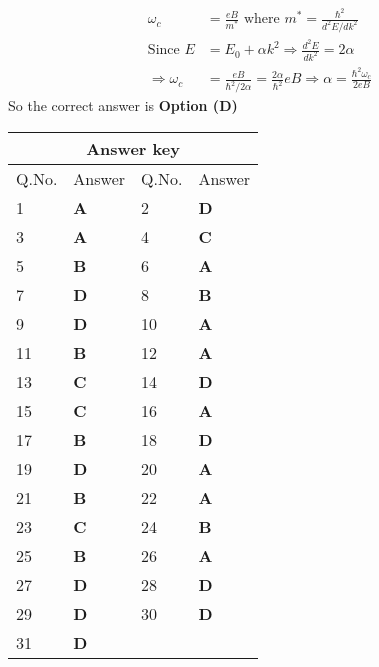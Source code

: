 \begin{enumerate}
\begin{tasks}
	\end{tasks}
	\begin{answer}
		\begin{align*}
		\omega_{c}&=\frac{e B}{m^{*}}\text{ where }m^{*}=\frac{\hbar^{2}}{d^{2} E / d k^{2}}\\
		\text{Since }E&=E_{0}+\alpha k^{2} \Rightarrow \frac{d^{2} E}{d k^{2}}=2 \alpha\\
		\Rightarrow \omega_{c}&=\frac{e B}{\hbar^{2} / 2 \alpha}=\frac{2 \alpha}{\hbar^{2}} e B \Rightarrow \alpha=\frac{\hbar^{2} \omega_{c}}{2 e B}
		\end{align*}
		So the correct answer is \textbf{Option (D)}
	\end{answer}
\end{enumerate}
\setlength\arrayrulewidth{1pt}
\begin{table}[H]
	\centering
	\begin{tabular}{|p{1.5cm}|p{1.5cm}||p{1.5cm}|p{1.5cm}|}
		\hline
		\multicolumn{4}{|c|}{\textbf{Answer key}}\\\hline\hline
		\rowcolor{ocrel}Q.No.&Answer&Q.No.&Answer\\\hline
		1&\textbf{A} &2&\textbf{D}\\\hline 
		3&\textbf{A} &4&\textbf{C} \\\hline
		5&\textbf{B} &6&\textbf{A} \\\hline
		7&\textbf{D}&8&\textbf{B}\\\hline
		9&\textbf{D}&10&\textbf{A}\\\hline
		11&\textbf{B} &12&\textbf{A}\\\hline
		13&\textbf{C}&14&\textbf{D}\\\hline
		15&\textbf{C}&16&\textbf{A} \\\hline
		17&\textbf{B}&18&\textbf{D}\\\hline
		19&\textbf{D}&20&\textbf{A}\\\hline
		21&\textbf{B} &22&\textbf{A}\\\hline
		23&\textbf{C}&24&\textbf{B}\\\hline
		25&\textbf{B}&26&\textbf{A} \\\hline
		27&\textbf{D}&28&\textbf{D}\\\hline
		29&\textbf{D}&30&\textbf{D}\\\hline
		31&\textbf{D} &&\textbf{}\\\hline
	\end{tabular}
\end{table}
